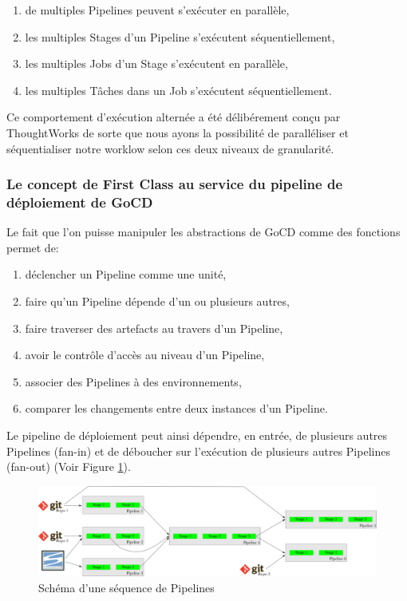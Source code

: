     \begin{enumerate}
      \item de multiples Pipelines peuvent s'exécuter en parallèle,
      \item les multiples Stages d'un Pipeline s'exécutent séquentiellement,
      \item les multiples Jobs d'un Stage s'exécutent en parallèle,
      \item les multiples Tâches dans un Job s'exécutent séquentiellement.\\
    \end{enumerate}

    Ce comportement d'exécution alternée a été délibérement conçu par ThoughtWorks de sorte que nous ayons la possibilité de paralléliser et séquentialiser notre worklow selon ces deux niveaux de granularité.

    \subsubsection{Le concept de First Class au service du pipeline de déploiement de GoCD}
    Le fait que l'on puisse manipuler les abstractions de GoCD comme des fonctions permet de:\\

    \begin{enumerate}
      \item déclencher un Pipeline comme une unité,
      \item faire qu'un Pipeline dépende d'un ou plusieurs autres,
      \item faire traverser des artefacts au travers d'un Pipeline,
      \item avoir le contrôle d'accès au niveau d'un Pipeline,
      \item associer des Pipelines à des environnements,
      \item comparer les changements entre deux instances d'un Pipeline.\\
    \end{enumerate}

    Le pipeline de déploiement peut ainsi dépendre, en entrée, de plusieurs autres Pipelines (fan-in) et de déboucher sur l'exécution de plusieurs autres Pipelines (fan-out) (Voir Figure \ref{VSM}).

    \begin{figure}
      \begin{center}
        \includegraphics[scale=0.7]{images/VSM.png}
      \end{center}
      \caption{Schéma d'une séquence de Pipelines}
      \label{VSM}
    \end{figure}

